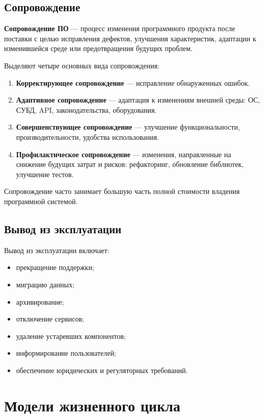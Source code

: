 \documentclass[12pt,a4paper]{article}
\begin{document}
\subsection{Сопровождение}

\textbf{Сопровождение ПО} --- процесс изменения программного продукта после поставки с целью исправления дефектов, улучшения характеристик, адаптации к изменившейся среде или предотвращения будущих проблем.

Выделяют четыре основных вида сопровождения:
\begin{enumerate}
    \item \textbf{Корректирующее сопровождение} --- исправление обнаруженных ошибок.
    \item \textbf{Адаптивное сопровождение} --- адаптация к изменениям внешней среды: ОС, СУБД, API, законодательства, оборудования.
    \item \textbf{Совершенствующее сопровождение} --- улучшение функциональности, производительности, удобства использования.
    \item \textbf{Профилактическое сопровождение} --- изменения, направленные на снижение будущих затрат и рисков: рефакторинг, обновление библиотек, улучшение тестов.
\end{enumerate}

Сопровождение часто занимает большую часть полной стоимости владения программной системой.

\subsection{Вывод из эксплуатации}

Вывод из эксплуатации включает:
\begin{itemize}
    \item прекращение поддержки;
    \item миграцию данных;
    \item архивирование;
    \item отключение сервисов;
    \item удаление устаревших компонентов;
    \item информирование пользователей;
    \item обеспечение юридических и регуляторных требований.
\end{itemize}

\section{Модели жизненного цикла}
\end{document}

